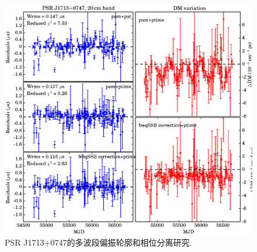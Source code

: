 \begin{figure}
\begin{center}
\includegraphics[width=6 in]{1713.ps}
\caption{PSR J1713$+$0747的多波段偏振轮廓和相位分离研究.}
\label{1713}
\end{center}
\end{figure}

